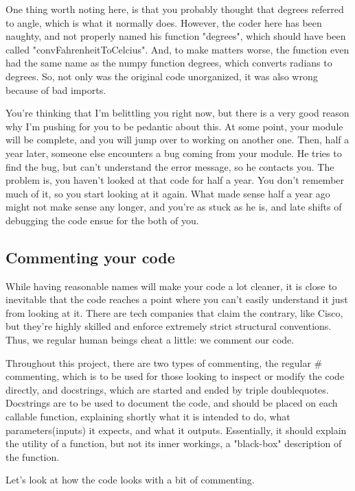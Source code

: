 \documentclass[10pt,a4paper]{article}
\begin{document}
One thing worth noting here, is that you probably thought that degrees referred to angle, which is what it normally does. However, the coder here has been naughty, and not properly named his function "degrees", which should have been called "convFahrenheitToCelcius". And, to make matters worse, the function even had the same name as the numpy function degrees, which converts radians to degrees. So, not only was the original code unorganized, it was also wrong because of bad imports.

You're thinking that I'm belittling you right now, but there is a very good reason why I'm pushing for you to be pedantic about this. At some point, your module will be complete, and you will jump over to working on another one. Then, half a year later, someone else encounters a bug coming from your module. He tries to find the bug, but can't understand the error message, so he contacts you. The problem is, you haven't looked at that code for half a year. You don't remember much of it, so you start looking at it again. What made sense half a year ago might not make sense any longer, and you're as stuck as he is, and late shifts of debugging the code ensue for the both of you. 

\subsection{Commenting your code}
While having reasonable names will make your code a lot cleaner, it is close to inevitable that the code reaches a point where you can't easily understand it just from looking at it. There are tech companies that claim the contrary, like Cisco, but they're highly skilled and enforce extremely strict structural conventions. Thus, we regular human beings cheat a little: we comment our code. 

Throughout this project, there are two types of commenting, the regular \# commenting, which is to be used for those looking to inspect or modify the code directly, and docstrings, which are started and ended by triple doublequotes. Docstrings are to be used to document the code, and should be placed on each callable function, explaining shortly what it is intended to do, what parameters(inputs) it expects, and what it outputs. Essentially, it should explain the utility of a function, but not its inner workings, a "black-box" description of the function.

Let's look at how the code looks with a bit of commenting.  
\end{document}
